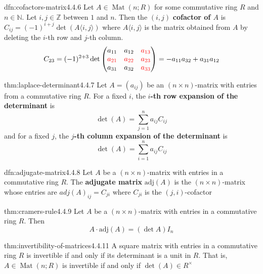 \documentclass[landscape, 8pt]{extarticle}
\DeclareMathOperator{\Mat}{Mat}
\begin{document}
\begin{multicols}{3}
\newpage
\begin{dfn}{dfn:cofactors-matrix}{4.4.6}
    Let $A \in \Mat(n;R)$ for some commutative ring $R$ and $n\in \mathbb{N}$. Let $i,j\in\mathbb{Z}$ between $1$ and $n$. Then the $(i, j)$ \textbf{cofactor of $A$} is $C_{ij} = (-1)^{i + j} \det(A\langle i,j \rangle)$ where $A\langle i, j \rangle$ is the matrix obtained from $A$ by deleting the $i$-th row and $j$-th column.
    \[C_{23} = (-1)^{2 + 3} \det \begin{pmatrix}
        a_{11} & a_{12}& \textcolor{red}{a_{13}}\\
        \textcolor{red}{a_{21}}& \textcolor{red}{a_{22}}& \textcolor{red}{a_{23}}\\
        a_{31}& a_{32}& \textcolor{red}{a_{33}}
    \end{pmatrix} = -a_{11}a_{32} + a_{31}a_{12}\]
\end{dfn}

\begin{thm}{thm:laplace-determinant}{4.4.7}
    Let $A = (a_{ij})$ be an $(n \times n)$-matrix with entries from a commutative ring $R$. For a fixed $i$, the \textbf{$i$-th row expansion of the determinant} is
    \[\det(A) = \sum_{j = 1}^{n}a_{ij}C_{ij}\]
    and for a fixed $j$, the \textbf{$j$-th column expansion of the determinant} is
    \[\det(A) = \sum_{i = 1}^{n} a_{ij} C_{ij}\]
\end{thm}

\begin{dfn}{dfn:adjugate-matrix}{4.4.8}
    Let $A$ be a $(n \times n)$-matrix with entries in a commutative ring $R$. The \textbf{adjugate matrix} $\text{adj}(A)$ is the $(n \times n)$-matrix whose entries are $adj(A)_{ij} = C_{ji}$ where $C_{ji}$ is the $(j, i)$-cofactor
\end{dfn}

\begin{thm}{thm:cramers-rule}{4.4.9}
    Let $A$ be a $(n \times n)$-matrix with entries in a commutative ring $R$. Then
    \[A \cdot \text{adj}(A) = (\det A)I_{n}\]
\end{thm}

\begin{thm}{thm:invertibility-of-matrices}{4.4.11}
    A square matrix with entries in a commutative ring $R$ is invertible if and only if its determinant is a unit in $R$. That is, $A\in \Mat(n;R)$ is invertible if and only if $\det(A)\in R^{\times}$
\end{thm}


\end{multicols}
\end{document}
